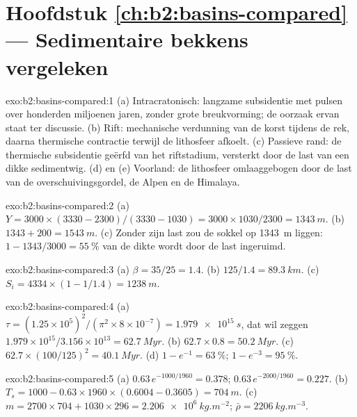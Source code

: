 \section*{Hoofdstuk \ref{ch:b2:basins-compared} --- Sedimentaire bekkens vergeleken}

\begin{solution}{exo:b2:basins-compared:1}
(a) Intracratonisch: langzame subsidentie met pulsen over honderden miljoenen jaren, zonder grote
breukvorming; de oorzaak ervan staat ter discussie. (b) Rift: mechanische verdunning van de korst tijdens de rek,
daarna thermische contractie terwijl de lithosfeer afkoelt. (c) Passieve rand: de thermische subsidentie
geërfd van het riftstadium, versterkt door de last van een dikke sedimentwig. (d) en (e)
Voorland: de lithosfeer omlaaggebogen door de last van de overschuivingsgordel, de Alpen en de Himalaya.
\end{solution}

\begin{solution}{exo:b2:basins-compared:2}
(a) $Y = 3000\times(3330 - 2300)/(3330 - 1030) = 3000\times1030/2300 = \qty{1343}{m}$.
(b) $1343 + 200 = \qty{1543}{m}$. (c) Zonder zijn last zou de sokkel op \qty{1343}{m} liggen:
$1 - 1343/3000 = \qty{55}{\percent}$ van de dikte wordt door de last ingeruimd.
\end{solution}

\begin{solution}{exo:b2:basins-compared:3}
(a) $\beta = 35/25 = 1.4$. (b) $125/1.4 = \qty{89.3}{km}$. (c) $S_i = 4334\times(1 - 1/1.4) =
\qty{1238}{m}$.
\end{solution}

\begin{solution}{exo:b2:basins-compared:4}
(a) $\tau = (1.25\times10^{5})^2/(\pi^2\times8\times10^{-7}) = \qty{1.979e15}{s}$, dat wil zeggen
$1.979\times10^{15}/3.156\times10^{13} = \qty{62.7}{Myr}$. (b) $62.7\times0.8 = \qty{50.2}{Myr}$.
(c) $62.7\times(100/125)^2 = \qty{40.1}{Myr}$. (d) $1 - e^{-1} = \qty{63}{\percent}$; $1 -
e^{-3} = \qty{95}{\percent}$.
\end{solution}

\begin{solution}{exo:b2:basins-compared:5}
(a) $0.63\,e^{-1000/1960} = 0.378$; $0.63\,e^{-2000/1960} = 0.227$. (b) $T_s = 1000 -
0.63\times1960\times(0.6004 - 0.3605) = \qty{704}{m}$. (c) $m = 2700\times704 + 1030\times296 =
\qty{2.206e6}{kg.m^{-2}}$; $\bar\rho = \qty{2206}{kg.m^{-3}}$.
\end{solution}

